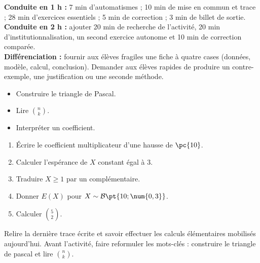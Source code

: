\ifmxteacher
\begin{method}
\textbf{Conduite en 1 h :} 7 min d'automatismes ; 10 min de mise en commun et trace ; 28 min d'exercices essentiels ; 5 min de correction ; 3 min de billet de sortie.\\
\textbf{Conduite en 2 h :} ajouter 20 min de recherche de l'activité, 20 min d'institutionnalisation, un second exercice autonome et 10 min de correction comparée.\\
\textbf{Différenciation :} fournir aux élèves fragiles une fiche à quatre cases (données, modèle, calcul, conclusion). Demander aux élèves rapides de produire un contre-exemple, une justification ou une seconde méthode.
\end{method}
\fi
{}
\begin{objectives}\begin{itemize}\item Construire le triangle de Pascal.\item Lire $\binom nk$.\item Interpréter un coefficient.\end{itemize}\end{objectives}
\begin{fluency}\begin{enumerate}\item Écrire le coefficient multiplicateur d'une hausse de $\pc{10}$. \item Calculer l'espérance de $X$ constant égal à $3$. \item Traduire $X\geq1$ par un complémentaire. \item Donner $E(X)$ pour $X\sim\mathcal B\pt{10;\num{0,3}}$. \item Calculer $\binom52$. \end{enumerate}\end{fluency}
\begin{prerequisites}Relire la dernière trace écrite et savoir effectuer les calculs élémentaires mobilisés aujourd'hui. Avant l'activité, faire reformuler les mots-clés : construire le triangle de pascal et lire $\binom nk$.\end{prerequisites}


